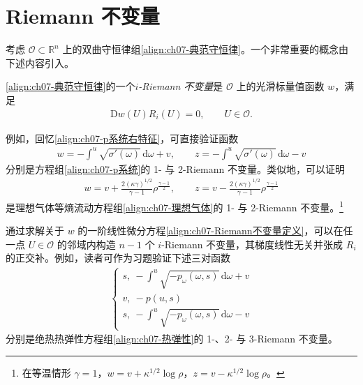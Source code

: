 \documentclass[../../main.tex]{subfiles}
\begin{document}
\section{Riemann 不变量}\label{section:ch07-Riemann不变量}

考虑 $\mathscr{O}\subset\mathbb{R}^n$ 上的双曲守恒律组\eqref{align:ch07-典范守恒律}。一个非常重要的概念由下述内容引入。

\begin{definition}\label{definition:ch07-iRiemann不变量}
\eqref{align:ch07-典范守恒律}的一个\emph{$i$-Riemann 不变量}是 $\mathscr{O}$ 上的光滑标量值函数 $w$，满足
\begin{align}
\mathrm{D}w(U)R_i(U)=0,\qquad U\in\mathscr{O}.
\label{align:ch07-Riemann不变量定义}
\end{align}
\end{definition}

例如，回忆\eqref{align:ch07-p系统右特征}，可直接验证函数
\begin{align}
w=-\int^u\sqrt{\sigma'(\omega)}\,\mathrm{d}\omega+v,\qquad
z=-\int^u\sqrt{\sigma'(\omega)}\,\mathrm{d}\omega-v
\label{align:ch07-p系统Riemann}
\end{align}
分别是方程组\eqref{align:ch07-p系统}的 1- 与 2-Riemann 不变量。类似地，可以证明
\begin{align}
w=v+\frac{2(\kappa\gamma)^{1/2}}{\gamma-1}\rho^{\frac{\gamma-1}{2}},\qquad
z=v-\frac{2(\kappa\gamma)^{1/2}}{\gamma-1}\rho^{\frac{\gamma-1}{2}}
\label{align:ch07-理想气体Riemann}
\end{align}
是理想气体等熵流动方程组\eqref{align:ch07-理想气体}的 1- 与 2-Riemann 不变量。\footnote{在等温情形 $\gamma=1$，$w=v+\kappa^{1/2}\log\rho$，$z=v-\kappa^{1/2}\log\rho$。}

通过求解关于 $w$ 的一阶线性微分方程\eqref{align:ch07-Riemann不变量定义}，可以在任一点 $U\in\mathscr{O}$ 的邻域内构造 $n-1$ 个 $i$-Riemann 不变量，其梯度线性无关并张成 $R_i$ 的正交补。例如，读者可作为习题验证下述三对函数
\begin{align}
\begin{cases}
s,\ -\displaystyle\int^u\sqrt{-p_\omega(\omega,s)}\,\mathrm{d}\omega+v\\[2mm]
v,\ -p(u,s)\\[2mm]
s,\ -\displaystyle\int^u\sqrt{-p_\omega(\omega,s)}\,\mathrm{d}\omega-v
\end{cases}
\label{align:ch07-热弹性Riemann}
\end{align}
分别是绝热热弹性方程组\eqref{align:ch07-热弹性}的 1-、2- 与 3-Riemann 不变量。
\end{document}
